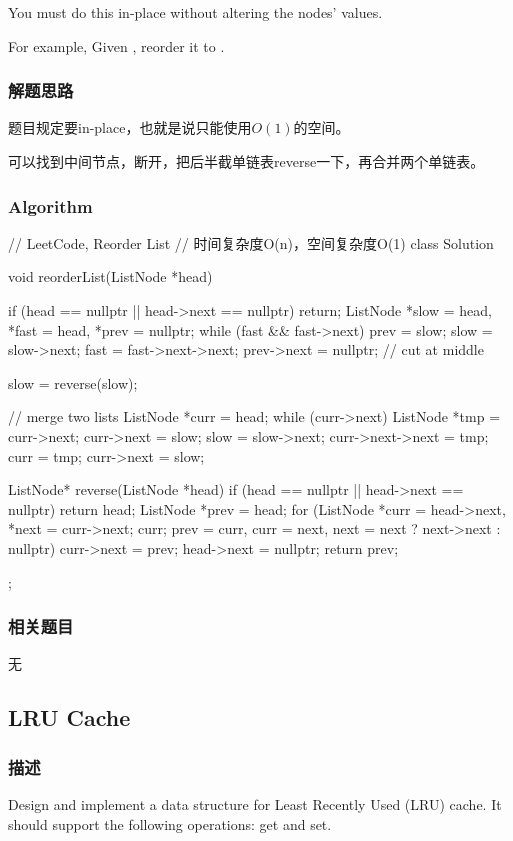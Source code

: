 You must do this in-place without altering the nodes' values.

For example,
Given , reorder it to .


\subsubsection{解题思路}
题目规定要in-place，也就是说只能使用$O(1)$的空间。

可以找到中间节点，断开，把后半截单链表reverse一下，再合并两个单链表。


\subsubsection{Algorithm}
\begin{Code}
	// LeetCode, Reorder List
	// 时间复杂度O(n)，空间复杂度O(1)
	class Solution {
		void reorderList(ListNode *head) {
			if (head == nullptr || head->next == nullptr) return;
			ListNode *slow = head, *fast = head, *prev = nullptr;
			while (fast && fast->next) {
				prev = slow;
				slow = slow->next;
				fast = fast->next->next;
			}
			prev->next = nullptr; // cut at middle
			
			slow = reverse(slow);
			
			// merge two lists
			ListNode *curr = head;
			while (curr->next) {
				ListNode *tmp = curr->next;
				curr->next = slow;
				slow = slow->next;
				curr->next->next = tmp;
				curr = tmp;
			}
			curr->next = slow;
		}
		
		ListNode* reverse(ListNode *head) {
			if (head == nullptr || head->next == nullptr) return head;
			ListNode *prev = head;
			for (ListNode *curr = head->next, *next = curr->next; curr;
				prev = curr, curr = next, next = next ? next->next : nullptr) 
				curr->next = prev;
			head->next = nullptr;
			return prev;
		}
	};
\end{Code}


\subsubsection{相关题目}
\begindot
\item 无
\myenddot


\subsection{LRU Cache}
\label{sec:LRU-Cachet}


\subsubsection{描述}
Design and implement a data structure for Least Recently Used (LRU) cache. It 
should support the following operations: get and set.

